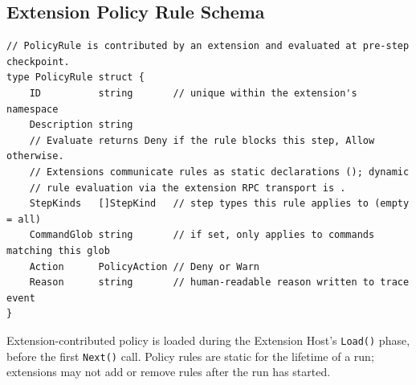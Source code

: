 \subsection{Extension Policy Rule Schema}

\begin{verbatim}
// PolicyRule is contributed by an extension and evaluated at pre-step checkpoint.
type PolicyRule struct {
    ID          string       // unique within the extension's namespace
    Description string
    // Evaluate returns Deny if the rule blocks this step, Allow otherwise.
    // Extensions communicate rules as static declarations (); dynamic
    // rule evaluation via the extension RPC transport is .
    StepKinds   []StepKind   // step types this rule applies to (empty = all)
    CommandGlob string       // if set, only applies to commands matching this glob
    Action      PolicyAction // Deny or Warn
    Reason      string       // human-readable reason written to trace event
}
\end{verbatim}

Extension-contributed policy is loaded during the Extension Host's \texttt{Load()} phase,
before the first \texttt{Next()} call. Policy rules are static for the lifetime of a run;
extensions may not add or remove rules after the run has started.
